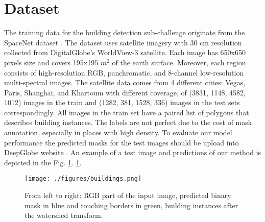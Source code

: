 \documentclass[10pt,twocolumn,letterpaper]{article}
\begin{document}



\section{Dataset}
The training data for the building detection sub-challenge originate from the SpaceNet dataset \cite{spacenet_dataset}. The dataset uses satellite imagery with 30 cm resolution collected from DigitalGlobe's WorldView-3 satellite. Each image has 650x650 pixels size and covers 195x195 $m^2$ of the earth surface. Moreover, each region consists of high-resolution RGB, panchromatic, and 8-channel low-resolution multi-spectral images. The satellite data comes from 4 different cities: Vegas, Paris, Shanghai, and Khartoum with different coverage, of  (3831, 1148, 4582, 1012) images in the train and (1282, 381, 1528, 336) images in the test sets correspondingly. All images in the train set have a paired list of polygons that describes building instances. The labels are not perfect due to the cost of mask annotation, especially in places with high density. To evaluate our model performance the predicted masks for the test images should be upload into DeepGlobe website \cite{deepglobe_website, demir2018deepglobe}. An example of a test image and predictions of our method is depicted in the Fig. \ref{fig:buildings}. \ref{fig:buildings}.

\begin{figure}[t]
\begin{center}
\texttt{[image: ./figures/buildings.png]}
\end{center}
   \caption{From left to right: RGB part of the input image, predicted binary mask in blue and touching borders  in green, building instances after the watershed transform.}
\label{fig:buildings}
\end{figure}
\end{document}
